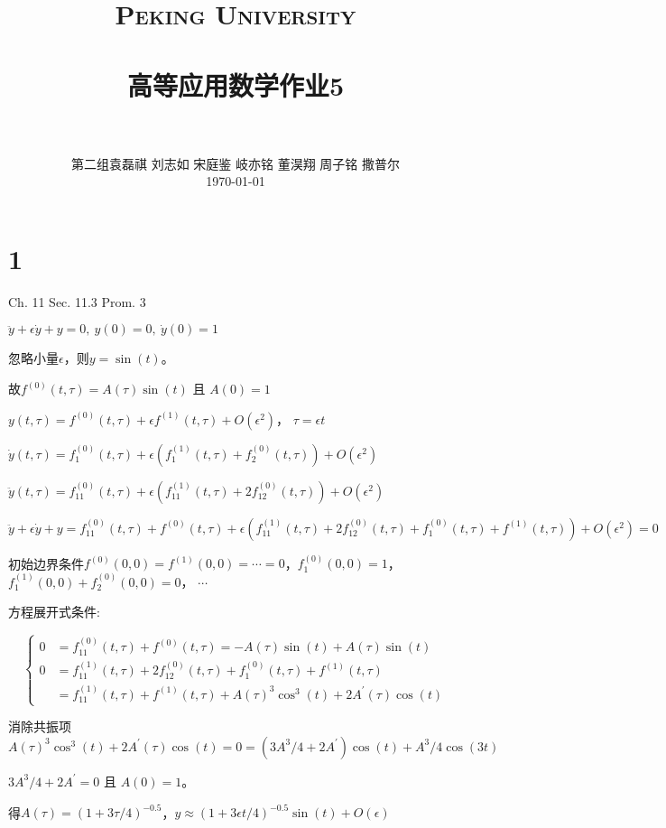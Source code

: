 \documentclass[12pt]{article}
\title{
		\vspace{-1in} 	
		\usefont{OT1}{bch}{b}{n}
		\normalfont \normalsize \textsc{\LARGE Peking University}\\[1cm] %
		\horrule{0.5pt} \\[0.5cm]
		\huge \bfseries{高等应用数学作业5} \\
		\horrule{2pt} \\[0.5cm]
}
\author{
		\normalfont 								\normalsize
		第二组\quad 袁磊祺 \quad 刘志如 \quad 宋庭鉴 \quad 岐亦铭 \quad 董淏翔 \quad 周子铭 \quad 撒普尔\\	\normalsize
        \today
}
\date{}
\begin{document}


\maketitle

\section{1}
Ch. 11 Sec. 11.3 Prom. 3

$\ddot{y} + \epsilon\dot{y} + y = 0,\ y(0)=0,\ \dot{y}(0)=1$

忽略小量$\epsilon$，则$y=\sin(t)$。

故$f^{(0)}(t,\tau) = A(\tau) \sin(t)$ 且 $A(0)=1$

$y(t,\tau) = f^{(0)}(t,\tau) + \epsilon f^{(1)}(t,\tau) + O(\epsilon^2)$， $\tau = \epsilon t$

$\dot{y}(t,\tau) = f^{(0)}_1(t,\tau) + \epsilon ( f^{(1)}_1(t,\tau) + f^{(0)}_2(t,\tau) ) +O(\epsilon^2)$

$\ddot{y}(t,\tau) = f^{(0)}_{11}(t,\tau) + \epsilon ( f^{(1)}_{11}(t,\tau) + 2f^{(0)}_{12}(t,\tau) ) + O(\epsilon^2)$

$\ddot{y} + \epsilon\dot{y} + y = f^{(0)}_{11}(t,\tau) + f^{(0)}(t,\tau) + \epsilon ( f^{(1)}_{11}(t,\tau) + 2f^{(0)}_{12}(t,\tau) + f^{(0)}_1(t,\tau) + f^{(1)}(t,\tau) )  + O(\epsilon^2) = 0 $

初始边界条件$f^{(0)}(0,0)=f^{(1)}(0,0)=\cdots=0$，$f^{(0)}_1(0,0)=1$，$f^{(1)}_1(0,0)+f^{(0)}_2(0,0)=0$， $\cdots$

方程展开式条件:

\begin{equation}
	\left\{
	\begin{array}{lll}
	0&=f^{(0)}_{11}(t,\tau) + f^{(0)}(t,\tau)=-A(\tau) \sin(t) + A(\tau) \sin(t)\\
	0&=f^{(1)}_{11}(t,\tau) + 2f^{(0)}_{12}(t,\tau) + f^{(0)}_1(t,\tau) + f^{(1)}(t,\tau)\\
	&=f^{(1)}_{11}(t,\tau) + f^{(1)}(t,\tau) + A(\tau)^3 \cos^3(t) + 2A^\prime(\tau) \cos(t)
	\end{array}
	\right.
\end{equation}


消除共振项$A(\tau)^3 \cos^3(t) + 2A^\prime(\tau) \cos(t) = 0 =(3A^3/4+2A^\prime)\cos(t) + A^3/4 \cos(3t)$

$3A^3/4+2A^\prime=0$ 且 $A(0)=1$。

得$A(\tau)=(1+3\tau/4)^{-0.5}$，$y \approx (1+3\epsilon t/4)^{-0.5} \sin(t) + O(\epsilon)$
\end{document}
